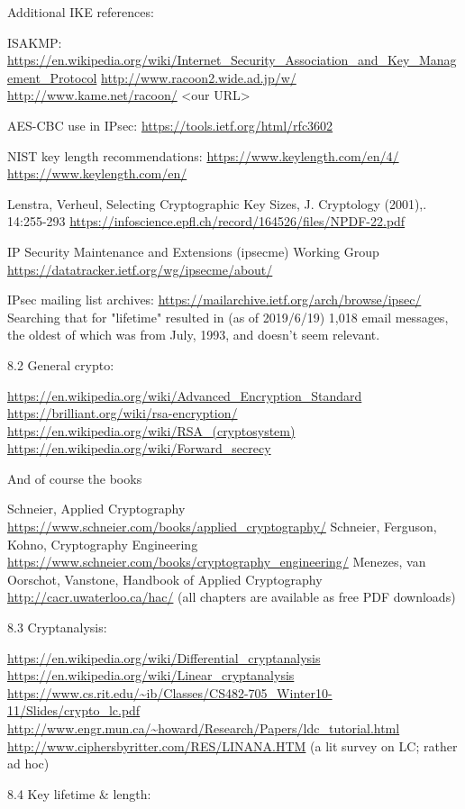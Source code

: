 \documentclass[%
 aip,
 jmp,%
 amsmath,amssymb,
 reprint,%
]{revtex4-1}
\begin{document}
Additional IKE references:

ISAKMP:
\url{https://en.wikipedia.org/wiki/Internet_Security_Association_and_Key_Management_Protocol}
\url{http://www.racoon2.wide.ad.jp/w/}
\url{http://www.kame.net/racoon/}
<our URL>

AES-CBC use in IPsec:
\url{https://tools.ietf.org/html/rfc3602}

NIST key length recommendations:
\url{https://www.keylength.com/en/4/}
\url{https://www.keylength.com/en/}

Lenstra, Verheul, Selecting Cryptographic Key Sizes, J. Cryptology
(2001),. 14:255-293
\url{https://infoscience.epfl.ch/record/164526/files/NPDF-22.pdf}

IP Security Maintenance and Extensions (ipsecme) Working Group
\url{https://datatracker.ietf.org/wg/ipsecme/about/}

IPsec mailing list archives:
\url{https://mailarchive.ietf.org/arch/browse/ipsec/}
Searching that for "lifetime" resulted in (as of 2019/6/19) 1,018
email messages, the oldest of which was from July, 1993, and doesn't
seem relevant.


8.2 General crypto:

\url{https://en.wikipedia.org/wiki/Advanced_Encryption_Standard }
\url{https://brilliant.org/wiki/rsa-encryption/}
\url{https://en.wikipedia.org/wiki/RSA_(cryptosystem)}
\url{https://en.wikipedia.org/wiki/Forward_secrecy}

And of course the books

Schneier, Applied Cryptography
\url{https://www.schneier.com/books/applied_cryptography/}
Schneier, Ferguson, Kohno, Cryptography Engineering
\url{https://www.schneier.com/books/cryptography_engineering/}
Menezes, van Oorschot, Vanstone, Handbook of Applied Cryptography
\url{http://cacr.uwaterloo.ca/hac/}
(all chapters are available as free PDF downloads)

8.3 Cryptanalysis:

\url{https://en.wikipedia.org/wiki/Differential_cryptanalysis}
\url{https://en.wikipedia.org/wiki/Linear_cryptanalysis}
\url{https://www.cs.rit.edu/~ib/Classes/CS482-705_Winter10-11/Slides/crypto_lc.pdf}
\url{http://www.engr.mun.ca/~howard/Research/Papers/ldc_tutorial.html}
\url{http://www.ciphersbyritter.com/RES/LINANA.HTM} (a lit survey on LC;
rather ad hoc)

8.4 Key lifetime \& length:
\end{document}
